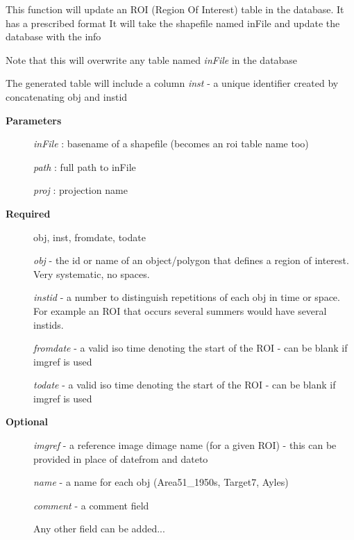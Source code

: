 \documentclass[letterpaper,10pt,english]{sphinxmanual}
\begin{document}
\begin{fulllineitems}

\begin{fulllineitems}
\label{code:Database.Database.updateROI}
This function will update an ROI (Region Of Interest) table in the database. It has a prescribed format
It will take the shapefile named inFile and update the database with the info

Note that this will overwrite any table named \emph{inFile} in the database

The generated table will include a column \emph{inst} - a unique identifier created by 
concatenating obj and instid
\begin{description}
\item[{\textbf{Parameters}}] \leavevmode
\emph{inFile}    :  basename of a shapefile (becomes an roi table name too)

\emph{path}  :   full path to inFile

\emph{proj}  :   projection name

\item[{\textbf{Required}}] \leavevmode
obj, inst, fromdate, todate

\emph{obj} - the id or name of an object/polygon that defines a region of interest. Very systematic, no spaces.

\emph{instid} - a number to distinguish repetitions of each obj in time or space.  For example an ROI that occurs several summers would have several instids.

\emph{fromdate} - a valid iso time denoting the start of the ROI - can be blank if imgref is used

\emph{todate} - a valid iso time denoting the start of the ROI - can be blank if imgref is used

\item[{\textbf{Optional}}] \leavevmode
\emph{imgref} - a reference image dimage name (for a given ROI) - this can be provided in place of datefrom and dateto

\emph{name} - a name for each obj (Area51\_1950s, Target7, Ayles)

\emph{comment} - a comment field

Any other field can be added...

\end{description}

\end{fulllineitems}


\end{fulllineitems}
\end{document}

